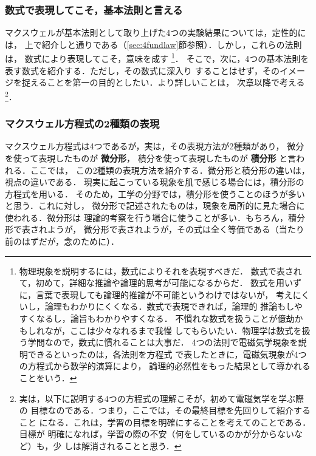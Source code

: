             \subsubsection{数式で表現してこそ，基本法則と言える}
            マクスウェルが基本法則として取り上げた4つの実験結果については，定性的には，
            上で紹介しと通りである（\ref{sec:4fundlaw}節参照）．しかし，これらの法則は，
            数式により表現してこそ，意味を成す
                \footnote{
                    物理現象を説明するには，数式によりそれを表現すべきだ．
                    数式で表されて，初めて，詳細な推論や論理的思考が可能になるからだ．
                    数式を用いずに，言葉で表現しても論理的推論が不可能というわけではないが，
                    考えにくいし，論理もわかりにくくなる．数式で表現できれば，論理的
                    推論もしやすくなるし，論旨もわかりやすくなる．
                    不慣れな数式を扱うことが億劫かもしれなが，ここは少々なれるまで我慢
                    してもらいたい．物理学は数式を扱う学問なので，数式に慣れることは大事だ．
                    4つの法則で電磁気学現象を説明できるといったのは，各法則を方程式
                    で表したときに，電磁気現象が4つの方程式から数学的演算により，
                    論理的必然性をもった結果として導かれることをいう．
                }．
            そこで，次に，4つの基本法則を表す数式を紹介する．ただし，その数式に深入り
            することはせず，そのイメージを捉えることを第一の目的としたい．より詳しいことは，
            次章以降で考える
                \footnote{
                    実は，以下に説明する4つの方程式の理解こそが，初めて電磁気学を学ぶ際の
                    目標なのである．つまり，ここでは，その最終目標を先回りして紹介すること
                    になる．これは，学習の目標を明確にすることを考えてのことである．目標が
                    明確になれば，学習の際の不安（何をしているのかが分からないなど）も，少
                    しは解消されることと思う．
                }．

            \subsubsection{マクスウェル方程式の2種類の表現}
            マクスウェル方程式は4つであるが，実は，その表現方法が2種類があり，
            微分を使って表現したものが \textbf{微分形}，
            積分を使って表現したものが \textbf{積分形} と言われる．ここでは，
            この2種類の表現方法を紹介する．微分形と積分形の違いは，視点の違いである．
            現実に起こっている現象を肌で感じる場合には，積分形の方程式を用いる．
            そのため，工学の分野では，積分形を使うことのほうが多いと思う．これに対し，
            微分形で記述されたものは，現象を局所的に見た場合に使われる．微分形は
            理論的考察を行う場合に使うことが多い．もちろん，積分形で表されようが，
            微分形で表されようが，その式は全く等価である（当たり前のはずだが，念のために）．


